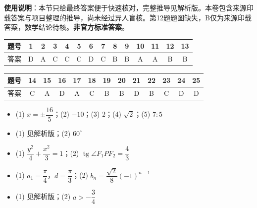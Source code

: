 
\begin{gknotice}
\textbf{使用说明}：本节只给最终答案便于快速核对，完整推导见解析版。本卷包含来源印载答案与项目整理的推导，尚未经过异人盲核。第12题题图缺失，B仅为来源印载答案，数学结论待核。\textbf{非官方标准答案}。
\end{gknotice}

\begin{center}\begin{tabular}{cccccccccccccc}
\toprule
题号 & 1 & 2 & 3 & 4 & 5 & 6 & 7 & 8 & 9 & 10 & 11 & 12 & 13 \\
\midrule
答案 & D & A & C & C & C & D & C & B & B & A & A & B & B \\
\bottomrule
\end{tabular}\end{center}\medskip
\begin{center}\begin{tabular}{ccccccccccccc}
\toprule
题号 & 14 & 15 & 16 & 17 & 18 & 19 & 20 & 21 & 22 & 23 & 24 & 25 \\
\midrule
答案 & C & A & D & A & C & B & B & D & B & C & D & D \\
\bottomrule
\end{tabular}\end{center}

\begin{itemize}[leftmargin=2.6em]
  \item[\textbf{一.}] (1) $x=\pm\dfrac{16}{5}$；(2) $-10$；(3) $2$；(4) $\sqrt2$；(5) $7:5$
  \item[\textbf{二.}] (1) 见解析版；(2) $60^\circ$
  \item[\textbf{三.}] (1) $\dfrac{y^2}{4}+\dfrac{x^2}{3}=1$；(2) $\operatorname{tg}\angle F_1PF_2=\dfrac43$
  \item[\textbf{四.}] (1) $a_1=\dfrac\pi4$，$d=\dfrac\pi3$；(2) $b_n=\dfrac{\sqrt2}{8}(-1)^{n-1}$
  \item[\textbf{五.}] (1) 见解析版；(2) $a>-\dfrac34$
\end{itemize}
